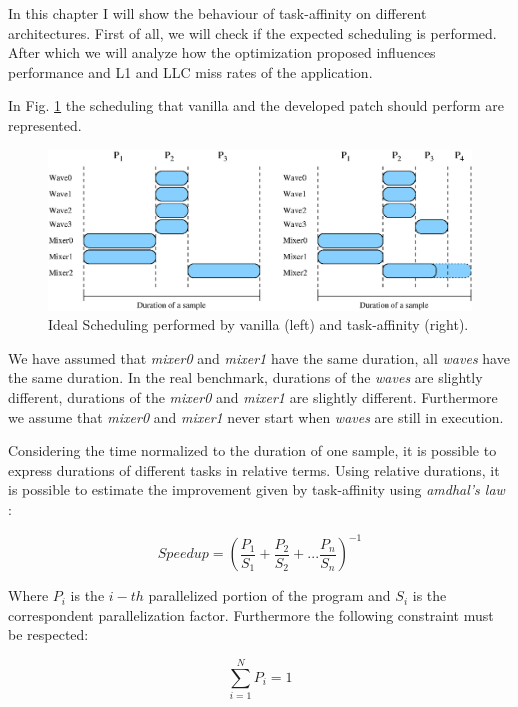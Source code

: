 In this chapter I will show the behaviour of task-affinity on different architectures. First of all, we will check if the expected scheduling is performed. 
After which we will analyze how the optimization proposed influences performance and L1 and LLC miss rates of the application. 

In Fig. \ref{fig:ideal_scheduling} the scheduling that vanilla and the developed patch should perform are represented.

\begin{figure}[htbp]
\centering
\includegraphics[width=\widefigure]{images/schedule_van_taskaff.eps}
\caption{Ideal Scheduling performed by vanilla (left) and task-affinity (right).}
\label{fig:ideal_scheduling}
\end{figure}

We have assumed that \textit{mixer0} and \textit{mixer1} have the same duration, all \textit{waves} have the same duration.
In the real benchmark, durations of the \textit{waves} are slightly different, durations of the \textit{mixer0} and 
\textit{mixer1} are slightly different. Furthermore we assume that \textit{mixer0} and \textit{mixer1} never start when \textit{waves} are still in 
execution.

Considering the time normalized to the duration of one sample, it is possible to express durations of different tasks in relative terms.
Using relative durations, it is possible to estimate the improvement given by task-affinity using \textit{amdhal's law} \cite{lcs}:

\begin{equation}
       Speedup = \left(\frac{P_{1}}{S_{1}} + \frac{P_{2}}{S_{2}} + ... \frac{P_{n}}{S_{n}} \right)^{-1} 
\label{eq:amdhal}
\end{equation}

Where $P_{i}$ is the $i-th$ parallelized portion of the program and $S_{i}$ is the correspondent parallelization factor. Furthermore the following 
constraint must be respected:

\begin{equation}
       \sum_{i=1}^N P_{i} = 1
\label{eq:contr_amdhal}
\end{equation}

